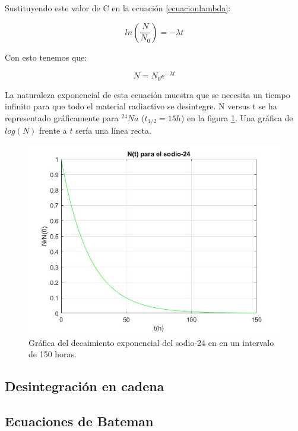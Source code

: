 \noindent Sustituyendo este valor de C en la ecuación \ref{ecuacionlambda}: 

\begin{equation}
    ln\left( \frac{N}{N_0} \right) = - \lambda t 
\end{equation}

\noindent Con esto tenemos que: 

\begin{equation}
    N = N_{0} e^{ - \lambda t }
\end{equation}

\noindent La naturaleza exponencial de esta ecuación muestra que se necesita un tiempo infinito para que todo el material radiactivo se desintegre. N versus t se ha representado gráficamente para $ ^{24} Na$ ($t_{1/2} = 15h$) en la figura \ref{decaimientodelsodio24}. Una gráfica de $log(N)$ frente a $t$ sería una línea recta.

\begin{figure}
    \begin{center}
        \includegraphics[scale=0.5]{imagenes/decaimiento_sodio_24.jpg}
        \caption{Gráfica del decaimiento exponencial del sodio-24 en en un intervalo de 150 horas.}
        \label{decaimientodelsodio24}
    \end{center}
\end{figure}

\subsection{Desintegración en cadena}


\subsection{Ecuaciones de Bateman}

